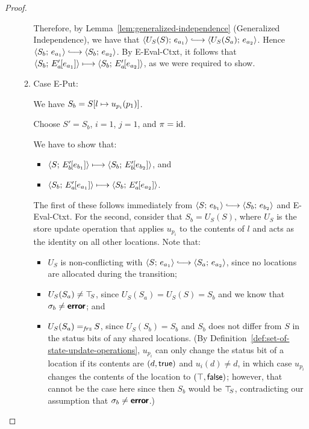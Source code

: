 \begin{proof}
\begin{enumerate}
\begin{enumerate}
      Therefore, by Lemma~\ref{lem:generalized-independence}
      (Generalized Independence), we have that
      $\config{U_S(S)}{e_{a_1}} \parstepsto
      \config{U_S(S_a)}{e_{a_2}}$.  Hence $\config{S_b}{e_{a_1}}
      \parstepsto \config{S_b}{e_{a_2}}$.  By {\sc E-Eval-Ctxt}, it
      follows that $\langle S_b;\, E'_a\hspace{-1mm}\left[e_{a_1}\right] \rangle \longmapsto
      \langle S_b;\, E'_a\hspace{-1mm}\left[e_{a_2}\right] \rangle$, as we were required to
      show.

    \item \label{slqc-beta-put}Case {\sc E-Put}: 

      We have $S_b = S[l \mapsto u_{p_i}(p_1)]$.

      Choose $S' = S_b$, $i = 1$, $j = 1$, and $\pi = \mathrm{id}$.

      We have to show that:
      \begin{itemize}
      \item $\langle S;\, E'_b\hspace{-1mm}\left[e_{b_1}\right] \rangle \longmapsto
        \langle S_b;\, E'_b\hspace{-1mm}\left[e_{b_2}\right] \rangle$, and
      \item
        $\langle S_b;\, E'_a\hspace{-1mm}\left[e_{a_1}\right] \rangle \longmapsto
        \langle S_b;\, E'_a\hspace{-1mm}\left[e_{a_2}\right] \rangle$.
      \end{itemize}

      The first of these follows immediately from $\config{S}{e_{b_1}}
      \parstepsto \config{S_b}{e_{b_2}}$ and {\sc E-Eval-Ctxt}.  For
      the second, consider that $S_b = U_S(S)$, where $U_S$ is the
      store update operation that applies $u_{p_i}$ to the contents of
      $l$ and acts as the identity on all other locations.  Note that:
      \begin{itemize}
      \item $U_S$ is non-conflicting with $\config{S}{e_{a_1}}
        \parstepsto \config{S_a}{e_{a_2}}$, since no locations are
        allocated during the transition;
        \item $U_S(S_a) \neq \top\hspace{-0.85mm}_{S}$, since $U_S(S_a) = U_S(S) = S_b$
          and we know that $\sigma_b \neq \textbf{\textsf{error}}$; and
        \item $U_S(S_a) =_{\textit{frz}} S$, since $U_S(S_b) = S_b$ and $S_b$
          does not differ from $S$ in the status bits of any shared
          locations.  (By
          Definition~\ref{def:set-of-state-update-operations},
          $u_{p_i}$ can only change the status bit of a location if
          its contents are $(d, \textsf{true})$ and $u_i(d) \neq
          d$, in which case $u_{p_i}$ changes the contents of the
          location to $(\top, \textsf{false})$; however, that
          cannot be the case here since then $S_b$ would be $\top\hspace{-0.85mm}_{S}$,
          contradicting our assumption that $\sigma_b \neq \textbf{\textsf{error}}$.)
      \end{itemize}


\end{enumerate}
\end{enumerate}
\end{proof}

